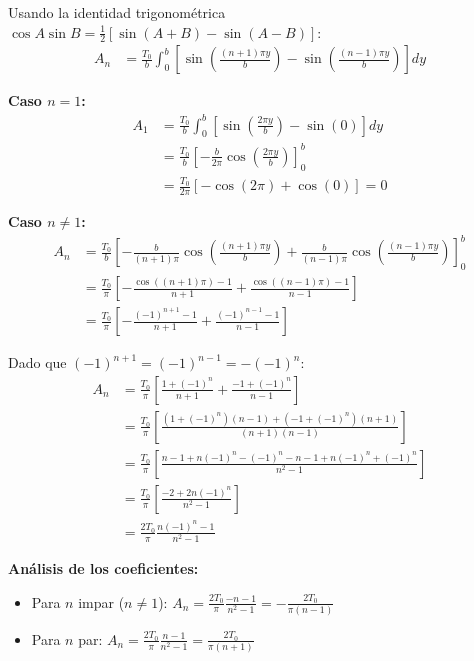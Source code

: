 \documentclass[a4paper]{article}
\begin{document}
Usando la identidad trigonométrica $\cos A \sin B = \frac{1}{2}[\sin(A+B) - \sin(A-B)]$:
\begin{align}
A_n &= \frac{T_0}{b} \int_0^b \left[ \sin\left(\frac{(n+1)\pi y}{b}\right) - \sin\left(\frac{(n-1)\pi y}{b}\right) \right] dy
\end{align}

\textbf{Caso $n = 1$:}
\begin{align}
A_1 &= \frac{T_0}{b} \int_0^b \left[ \sin\left(\frac{2\pi y}{b}\right) - \sin(0) \right] dy \\
&= \frac{T_0}{b} \left[ -\frac{b}{2\pi} \cos\left(\frac{2\pi y}{b}\right) \right]_0^b \\
&= \frac{T_0}{2\pi} [-\cos(2\pi) + \cos(0)] = 0
\end{align}

\textbf{Caso $n \neq 1$:}
\begin{align}
A_n &= \frac{T_0}{b} \left[ -\frac{b}{(n+1)\pi} \cos\left(\frac{(n+1)\pi y}{b}\right) + \frac{b}{(n-1)\pi} \cos\left(\frac{(n-1)\pi y}{b}\right) \right]_0^b \\
&= \frac{T_0}{\pi} \left[ -\frac{\cos((n+1)\pi) - 1}{n+1} + \frac{\cos((n-1)\pi) - 1}{n-1} \right] \\
&= \frac{T_0}{\pi} \left[ -\frac{(-1)^{n+1} - 1}{n+1} + \frac{(-1)^{n-1} - 1}{n-1} \right]
\end{align}

Dado que $(-1)^{n+1} = (-1)^{n-1} = -(-1)^n$:
\begin{align}
A_n &= \frac{T_0}{\pi} \left[ \frac{1 + (-1)^n}{n+1} + \frac{-1 + (-1)^n}{n-1} \right] \\
&= \frac{T_0}{\pi} \left[ \frac{(1 + (-1)^n)(n-1) + (-1 + (-1)^n)(n+1)}{(n+1)(n-1)} \right] \\
&= \frac{T_0}{\pi} \left[ \frac{n - 1 + n(-1)^n - (-1)^n - n - 1 + n(-1)^n + (-1)^n}{n^2 - 1} \right] \\
&= \frac{T_0}{\pi} \left[ \frac{-2 + 2n(-1)^n}{n^2 - 1} \right] \\
&= \frac{2T_0}{\pi} \frac{n(-1)^n - 1}{n^2 - 1}
\end{align}

\textbf{Análisis de los coeficientes:}
\begin{itemize}
    \item Para $n$ impar ($n \neq 1$): $A_n = \frac{2T_0}{\pi} \frac{-n - 1}{n^2 - 1} = -\frac{2T_0}{\pi(n-1)}$
    \item Para $n$ par: $A_n = \frac{2T_0}{\pi} \frac{n - 1}{n^2 - 1} = \frac{2T_0}{\pi(n+1)}$
\end{itemize}
\end{document}
